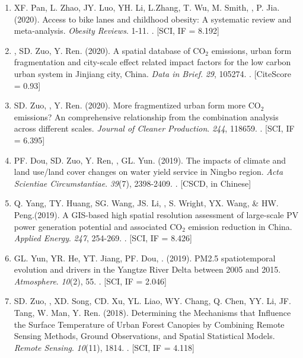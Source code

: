 \begin{enumerate}
\item
    XF. Pan, L. Zhao, JY. Luo, YH. Li, L.Zhang, T. Wu, M. Smith, \Shaoqing, P. Jia. (2020).
    Access to bike lanes and childhood obesity: A systematic review and meta‐analysis.
    \textit{Obesity Reviews}. 1-11.
    . [SCI, IF = 8.192]
\item
    \Shaoqing, SD. Zuo, Y. Ren. (2020).
    A spatial database of CO$_2$ emissions, urban form fragmentation and city-scale effect related impact factors for the low carbon urban system in Jinjiang city, China.
    \textit{Data in Brief}. \textit{29}, 105274.
    . [CiteScore = 0.93]
\item
    SD. Zuo, \Shaoqing, Y. Ren. (2020).
    More fragmentized urban form more CO$_2$ emissions? An comprehensive relationship from the combination analysis across different scales.
    \textit{Journal of Cleaner Production}. \textit{244}, 118659.
    . [SCI, IF = 6.395]
\item
    PF. Dou, SD. Zuo, Y. Ren, \Shaoqing, GL. Yun. (2019).
    The impacts of climate and land use/land cover changes on water yield service in Ningbo region.
    \textit{Acta Scientiae Circumstantiae}. \textit{39}(7), 2398-2409.
    . [CSCD, in Chinese] 
\item
    Q. Yang, TY. Huang, SG. Wang, JS. Li, \Shaoqing, S. Wright, YX. Wang, \& HW. Peng.(2019).
    A GIS-based high spatial resolution assessment of large-scale PV power generation potential and associated CO$_2$ emission reduction in China.
    \textit{Applied Energy}. \textit{247}, 254-269.
    . [SCI, IF = 8.426]
\item
    GL. Yun, YR. He, YT. Jiang, PF. Dou, \Shaoqing. (2019).
    PM2.5 spatiotemporal evolution and drivers in the Yangtze River Delta between 2005 and 2015.
    \textit{Atmosphere}. \textit{10}(2), 55.
    . [SCI, IF = 2.046]
\item
    SD. Zuo, \Shaoqing, XD. Song, CD. Xu, YL. Liao, WY. Chang, Q. Chen, YY. Li, JF. Tang, W. Man, Y. Ren. (2018).
    Determining the Mechanisms that Influence the Surface Temperature of Urban Forest Canopies by Combining Remote Sensing Methods, Ground Observations, and Spatial Statistical Models. 
    \textit{Remote Sensing}. \textit{10}(11), 1814.
    . [SCI, IF = 4.118]

\end{enumerate}
